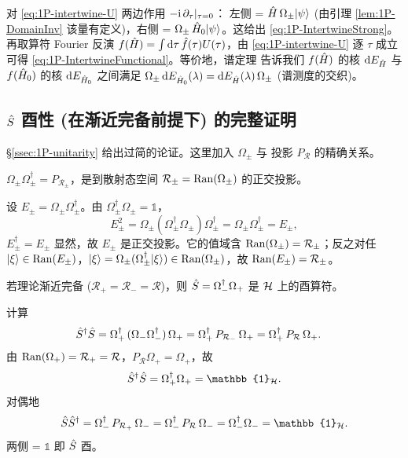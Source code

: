 \begin{proof*}
对 \eqref{eq:1P-intertwine-U} 两边作用 $-\mathrm{i}\,\partial_\tau|_{\tau=0}$：
左侧 = $\hat{H}\,\Omega_\pm|\psi\rangle$ (由引理 \ref{lem:1P-DomainInv}
该量有定义)，右侧 = $\Omega_\pm\,\hat{H}_0|\psi\rangle$。这给出
\eqref{eq:1P-IntertwineStrong}。再取算符 Fourier 反演
$f(\hat{H})=\int\mathrm{d}\tau\,\hat f(\tau)U(\tau)$，由 \eqref{eq:1P-intertwine-U}
逐 $\tau$ 成立可得 \eqref{eq:1P-IntertwineFunctional}。等价地，谱定理
告诉我们 $f(\hat{H})$ 的核 $\mathrm{d} E_{\hat{H}}$ 与 $f(\hat{H}_0)$ 的核
$\mathrm{d} E_{\hat{H}_0}$ 之间满足 $\Omega_\pm\,\mathrm{d} E_{\hat{H}_0}(\lambda)
=\mathrm{d} E_{\hat{H}}(\lambda)\,\Omega_\pm$ (谱测度的交织)。
\end{proof*}

\subsection{$\Smat$ 酉性 (在渐近完备前提下) 的完整证明}
\label{ssec:1P-UnitaryFull}

\S\ref{ssec:1P-unitarity} 给出过简的论证。这里加入 $\Omega_\pm$ 与
投影 $P_\mathcal{R}$ 的精确关系。

\begin{lemma}
\label{lem:1P-OmegaOmegaDag}
$\Omega_\pm\Omega_\pm^{\dagger} = P_{\mathcal{R}_\pm}$，是到散射态空间
$\mathcal{R}_\pm=\operatorname{Ran}(\Omega_\pm)$ 的正交投影。
\end{lemma}

\begin{proof*}
设 $E_\pm=\Omega_\pm\Omega_\pm^\dagger$。由
$\Omega_\pm^\dagger\Omega_\pm=\mathbb{1}$，
\[
  E_\pm^2 = \Omega_\pm(\Omega_\pm^\dagger\Omega_\pm)\Omega_\pm^\dagger
  = \Omega_\pm\Omega_\pm^\dagger = E_\pm,
\]
$E_\pm^\dagger = E_\pm$ 显然，故 $E_\pm$ 是正交投影。它的值域含
$\operatorname{Ran}(\Omega_\pm)=\mathcal{R}_\pm$；反之对任 $|\xi\rangle\in
\operatorname{Ran}(E_\pm)$，$|\xi\rangle = \Omega_\pm(\Omega_\pm^\dagger|\xi\rangle)
\in\operatorname{Ran}(\Omega_\pm)$，故 $\operatorname{Ran}(E_\pm)=\mathcal{R}_\pm$。
\end{proof*}

\begin{theorem}[$\Smat$ 酉]
\label{thm:1P-SUnitaryFull}
若理论渐近完备 ($\mathcal{R}_+=\mathcal{R}_-=\mathcal{R}$)，则
$\hat{S}=\Omega_-^\dagger\Omega_+$ 是 $\mathcal{H}$ 上的酉算符。
\end{theorem}

\begin{proof*}
计算
\begin{align*}
  \hat{S}^\dagger\hat{S}
  &= \Omega_+^\dagger\,(\Omega_-\Omega_-^\dagger)\,\Omega_+
   = \Omega_+^\dagger\,P_{\mathcal{R}_-}\,\Omega_+
   = \Omega_+^\dagger\,P_{\mathcal{R}}\,\Omega_+.
\end{align*}
由 $\operatorname{Ran}(\Omega_+)=\mathcal{R}_+=\mathcal{R}$，$P_\mathcal{R}\Omega_+
=\Omega_+$，故
\[
  \Smat^\dagger\Smat = \Omega_+^\dagger\Omega_+ = \mathbb{1}_\Hilb.
\]
对偶地
\[
  \Smat\Smat^\dagger
   = \Omega_-^\dagger\,P_{\mathcal{R}_+}\,\Omega_-
   = \Omega_-^\dagger\,P_{\mathcal{R}}\,\Omega_-
   = \Omega_-^\dagger\Omega_- = \mathbb{1}_\Hilb.
\]
两侧 = $\mathbb{1}$ 即 $\Smat$ 酉。
\end{proof*}

